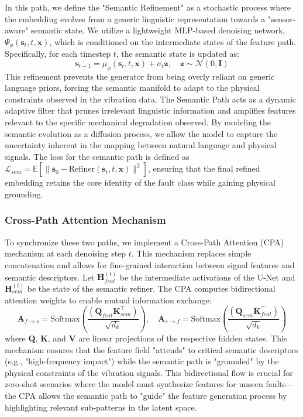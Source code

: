 In this path, we define the "Semantic Refinement" as a stochastic process where the embedding evolves from a generic linguistic representation towards a "sensor-aware" semantic state. We utilize a lightweight MLP-based denoising network, $\Psi_\phi(\mathbf{s}_t, t, \mathbf{x})$, which is conditioned on the intermediate states of the feature path. Specifically, for each timestep $t$, the semantic state is updated as:
\begin{equation}
\mathbf{s}_{t-1} = \mu_\phi(\mathbf{s}_t, t, \mathbf{x}) + \sigma_t \mathbf{z}, \quad \mathbf{z} \sim \mathcal{N}(0, \mathbf{I})
\end{equation}
This refinement prevents the generator from being overly reliant on generic language priors, forcing the semantic manifold to adapt to the physical constraints observed in the vibration data. The Semantic Path acts as a dynamic adaptive filter that prunes irrelevant linguistic information and amplifies features relevant to the specific mechanical degradation observed. By modeling the semantic evolution as a diffusion process, we allow the model to capture the uncertainty inherent in the mapping between natural language and physical signals. The loss for the semantic path is defined as $\mathcal{L}_{sem} = \mathbb{E} [\| \mathbf{s}_0 - \text{Refiner}(\mathbf{s}_t, t, \mathbf{x}) \|^2]$, ensuring that the final refined embedding retains the core identity of the fault class while gaining physical grounding.

\subsubsection{Cross-Path Attention Mechanism}
To synchronize these two paths, we implement a Cross-Path Attention (CPA) mechanism at each denoising step $t$. This mechanism replaces simple concatenation and allows for fine-grained interaction between signal features and semantic descriptors. Let $\mathbf{H}_{feat}^{(t)}$ be the intermediate activations of the U-Net and $\mathbf{H}_{sem}^{(t)}$ be the state of the semantic refiner. The CPA computes bidirectional attention weights to enable mutual information exchange:
\begin{equation}
\mathbf{A}_{f \to s} = \text{Softmax}\left(\frac{(\mathbf{Q}_{feat} \mathbf{K}_{sem}^\top)}{\sqrt{d_k}}\right), \quad \mathbf{A}_{s \to f} = \text{Softmax}\left(\frac{(\mathbf{Q}_{sem} \mathbf{K}_{feat}^\top)}{\sqrt{d_k}}\right)
\end{equation}
where $\mathbf{Q}$, $\mathbf{K}$, and $\mathbf{V}$ are linear projections of the respective hidden states. This mechanism ensures that the feature field "attends" to critical semantic descriptors (e.g., "high-frequency impact") while the semantic path is "grounded" by the physical constraints of the vibration signals. This bidirectional flow is crucial for zero-shot scenarios where the model must synthesize features for unseen faults—the CPA allows the semantic path to "guide" the feature generation process by highlighting relevant sub-patterns in the latent space.

